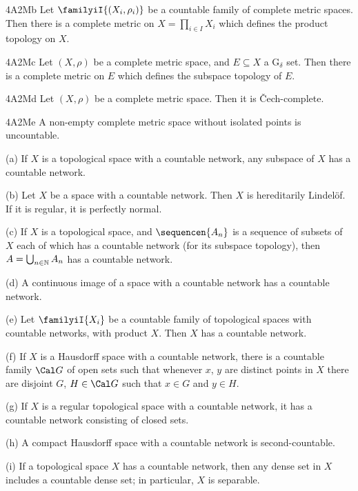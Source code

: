 \spheader 4A2Mb Let $\familyiI{(X_i,\rho_i)}$ be a countable family of
complete metric spaces.   Then there is a complete metric on
$X=\prod_{i\in I}X_i$ which defines the product topology on $X$.

\spheader 4A2Mc Let $(X,\rho)$ be a complete metric space, and
$E\subseteq X$ a G$_{\delta}$ set.   Then there is a complete metric on
$E$ which defines the subspace topology of $E$.

\spheader 4A2Md Let $(X,\rho)$ be a complete metric space.   Then it is
\v{C}ech-complete.   

\spheader 4A2Me A non-empty complete metric space without isolated
points is uncountable.  %

 (a) If $X$ is a
topological space with a
countable network, any subspace of $X$ has a countable network.

(b) Let $X$ be a space with a countable network.    Then $X$ is
hereditarily Lindel\"of.   If it is regular, it is perfectly normal.

(c) If $X$ is a topological space, and $\sequencen{A_n}$ is a sequence
of subsets of $X$ each of which has a countable network (for its
subspace topology), then $A=\bigcup_{n\in\Bbb N}A_n$ has a countable
network.

(d) A continuous image of a space with a countable network has a
countable network.

(e) Let $\familyiI{X_i}$ be a countable family of topological spaces
with countable networks, with product $X$.   Then $X$ has a countable
network.

(f) If $X$ is a Hausdorff space with a countable network, there is a
countable family $\Cal G$ of open sets such that whenever $x$, $y$ are
distinct points in $X$ there are disjoint $G$, $H\in\Cal G$ such that
$x\in G$ and $y\in H$.

(g) If $X$ is a regular topological space with a countable network, it
has a countable network consisting of closed sets.

(h) A compact Hausdorff space with a countable network
is second-countable.

(i) If a topological space $X$ has a countable network, then any dense
set in $X$ includes a countable dense set;  in particular, $X$ is
separable.

